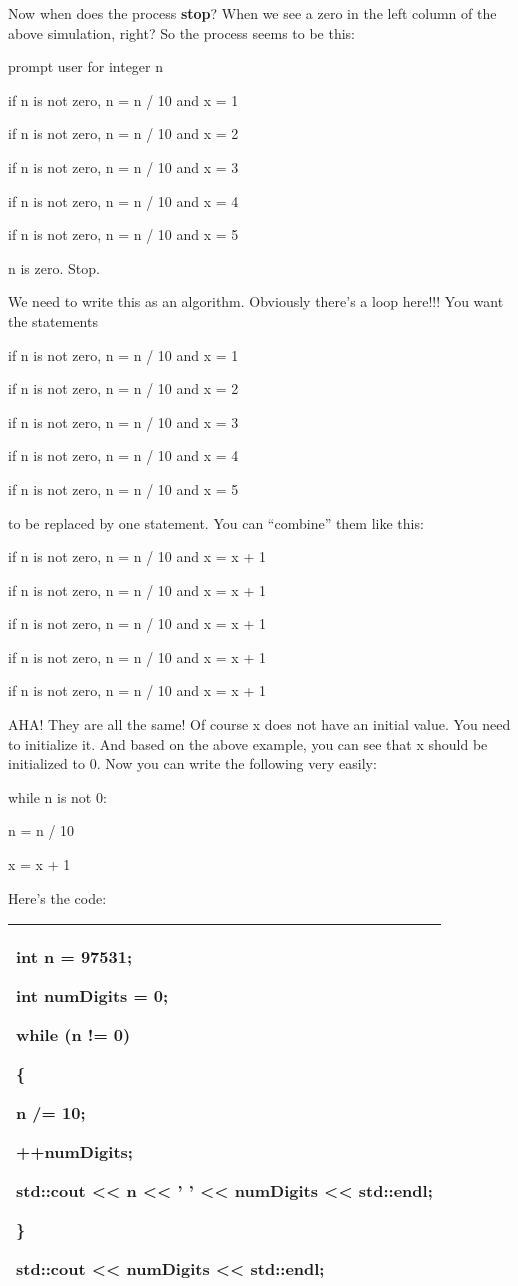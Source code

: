 \documentclass[
]{article}
\begin{document}
Now when does the process \textbf{stop}? When we see a zero in the left
column of the above simulation, right? So the process seems to be this:

prompt user for integer n

if n is not zero, n = n / 10 and x = 1

if n is not zero, n = n / 10 and x = 2

if n is not zero, n = n / 10 and x = 3

if n is not zero, n = n / 10 and x = 4

if n is not zero, n = n / 10 and x = 5

n is zero. Stop.

We need to write this as an algorithm. Obviously there's a loop here!!!
You want the statements

if n is not zero, n = n / 10 and x = 1

if n is not zero, n = n / 10 and x = 2

if n is not zero, n = n / 10 and x = 3

if n is not zero, n = n / 10 and x = 4

if n is not zero, n = n / 10 and x = 5

to be replaced by one statement. You can ``combine'' them like this:

if n is not zero, n = n / 10 and x = x + 1

if n is not zero, n = n / 10 and x = x + 1

if n is not zero, n = n / 10 and x = x + 1

if n is not zero, n = n / 10 and x = x + 1

if n is not zero, n = n / 10 and x = x + 1

AHA! They are all the same! Of course x does not have an initial value.
You need to initialize it. And based on the above example, you can see
that x should be initialized to 0. Now you can write the following very
easily:

while n is not 0:

n = n / 10

x = x + 1

Here's the code:

\begin{longtable}[]{@{}l@{}}
\toprule
\endhead
\begin{minipage}[t]{0.97\columnwidth}\raggedright
int n = 97531;

int numDigits = 0;

while (n != 0)

\{

n /= 10;

++numDigits;

std::cout \textless\textless{} n \textless\textless{} ' '
\textless\textless{} numDigits \textless\textless{} std::endl;

\}

std::cout \textless\textless{} numDigits \textless\textless{}
std::endl;\strut
\end{minipage}\tabularnewline
\bottomrule
\end{longtable}
\end{document}
